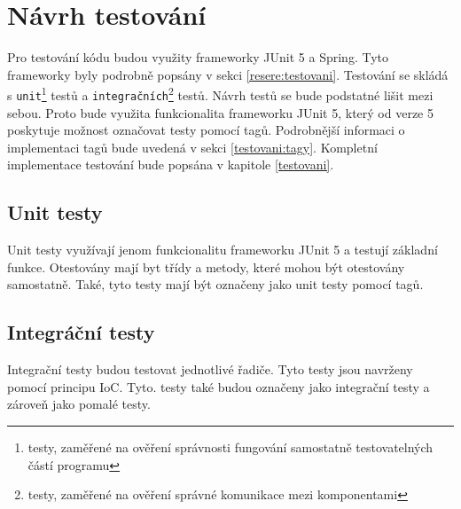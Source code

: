     
\section{Návrh testování}\label{navrh:testovani}
    Pro testování kódu budou využity frameworky JUnit 5 a Spring. Tyto frameworky byly podrobně popsány v sekci \ref{resere:testovani}. Testování se skládá s \texttt{unit}\footnote{testy, zaměřené na ověření správnosti fungování samostatně testovatelných částí programu} testů a \texttt{integračních}\footnote{testy, zaměřené na ověření správné komunikace mezi komponentami} testů. Návrh testů se bude podstatné lišit mezi sebou. Proto bude využita funkcionalita frameworku JUnit 5, který od verze 5 poskytuje možnost označovat testy pomocí tagů\cite{junit-tags}. Podrobnější informaci o implementaci tagů bude uvedená v sekci \ref{testovani:tagy}. Kompletní implementace testování bude popsána v kapitole \ref{testovani}.
    
    \subsection{Unit testy}
        Unit testy využívají jenom funkcionalitu frameworku JUnit 5 a testují základní funkce. Otestovány mají byt třídy a metody, které mohou být otestovány samostatně. Také, tyto testy mají být označeny jako unit testy pomocí tagů.  %
        
    \subsection{Integráční testy}
        Integrační testy budou testovat jednotlivé řadiče. Tyto testy jsou navrženy pomocí principu IoC. Tyto. testy také budou označeny jako integrační testy a zároveň jako pomalé testy.
